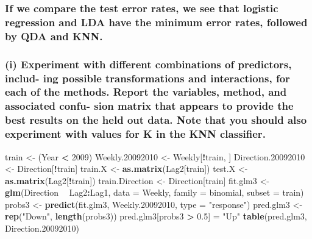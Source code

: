 \documentclass[]{article}
\newenvironment{Shaded}{\begin{snugshade}}{\end{snugshade}}
\newcommand{\KeywordTok}[1]{\textcolor[rgb]{0.13,0.29,0.53}{\textbf{#1}}}
\newcommand{\DataTypeTok}[1]{\textcolor[rgb]{0.13,0.29,0.53}{#1}}
\newcommand{\DecValTok}[1]{\textcolor[rgb]{0.00,0.00,0.81}{#1}}
\newcommand{\FloatTok}[1]{\textcolor[rgb]{0.00,0.00,0.81}{#1}}
\newcommand{\StringTok}[1]{\textcolor[rgb]{0.31,0.60,0.02}{#1}}
\newcommand{\OperatorTok}[1]{\textcolor[rgb]{0.81,0.36,0.00}{\textbf{#1}}}
\newcommand{\NormalTok}[1]{#1}
\begin{document}
\subsubsection{If we compare the test error rates, we see that logistic
regression and LDA have the minimum error rates, followed by QDA and
KNN.}\label{if-we-compare-the-test-error-rates-we-see-that-logistic-regression-and-lda-have-the-minimum-error-rates-followed-by-qda-and-knn.}

\subsubsection{(i) Experiment with different combinations of predictors,
includ- ing possible transformations and interactions, for each of the
methods. Report the variables, method, and associated confu- sion matrix
that appears to provide the best results on the held out data. Note that
you should also experiment with values for K in the KNN
classifier.}\label{i-experiment-with-different-combinations-of-predictors-includ--ing-possible-transformations-and-interactions-for-each-of-the-methods.-report-the-variables-method-and-associated-confu--sion-matrix-that-appears-to-provide-the-best-results-on-the-held-out-data.-note-that-you-should-also-experiment-with-values-for-k-in-the-knn-classifier.}

\begin{Shaded}
\begin{Highlighting}[]
\NormalTok{train <-}\StringTok{ }\NormalTok{(Year }\OperatorTok{<}\StringTok{ }\DecValTok{2009}\NormalTok{)}
\NormalTok{Weekly.}\DecValTok{20092010}\NormalTok{ <-}\StringTok{ }\NormalTok{Weekly[}\OperatorTok{!}\NormalTok{train, ]}
\NormalTok{Direction.}\DecValTok{20092010}\NormalTok{ <-}\StringTok{ }\NormalTok{Direction[}\OperatorTok{!}\NormalTok{train]}
\NormalTok{train.X <-}\StringTok{ }\KeywordTok{as.matrix}\NormalTok{(Lag2[train])}
\NormalTok{test.X <-}\StringTok{ }\KeywordTok{as.matrix}\NormalTok{(Lag2[}\OperatorTok{!}\NormalTok{train])}
\NormalTok{train.Direction <-}\StringTok{ }\NormalTok{Direction[train]}
\NormalTok{fit.glm3 <-}\StringTok{ }\KeywordTok{glm}\NormalTok{(Direction }\OperatorTok{~}\StringTok{ }\NormalTok{Lag2}\OperatorTok{:}\NormalTok{Lag1, }\DataTypeTok{data =}\NormalTok{ Weekly, }\DataTypeTok{family =}\NormalTok{ binomial, }\DataTypeTok{subset =}\NormalTok{ train)}
\NormalTok{probs3 <-}\StringTok{ }\KeywordTok{predict}\NormalTok{(fit.glm3, Weekly.}\DecValTok{20092010}\NormalTok{, }\DataTypeTok{type =} \StringTok{"response"}\NormalTok{)}
\NormalTok{pred.glm3 <-}\StringTok{ }\KeywordTok{rep}\NormalTok{(}\StringTok{"Down"}\NormalTok{, }\KeywordTok{length}\NormalTok{(probs3))}
\NormalTok{pred.glm3[probs3 }\OperatorTok{>}\StringTok{ }\FloatTok{0.5}\NormalTok{] =}\StringTok{ "Up"}
\KeywordTok{table}\NormalTok{(pred.glm3, Direction.}\DecValTok{20092010}\NormalTok{)}
\end{Highlighting}
\end{Shaded}
\end{document}

